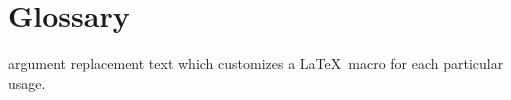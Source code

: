 \documentclass[main.tex]{subfiles}
\begin{document}
\chapter*{Glossary} 
\thispagestyle{plain}
%
\begin{glossary}
\item[argument] replacement text which customizes a \LaTeX\ macro for
each particular usage.
\end{glossary}
\end{document}
